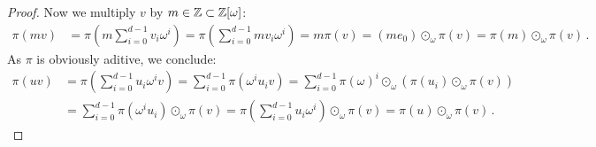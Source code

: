 \begin{proof}
Now we multiply $v$ by $m\in\mathbb{Z}\subset\mathbb{Z}[\omega]$:
\begin{align*}
\pi(m v)&=\pi\left(m \sum_{i=0}^{d-1} v_i \omega^i\right)=\pi \left(\sum_{i=0}^{d-1} m v_i \omega^i\right)=m \pi(v)= (m e_0) \odot_\omega\pi(v)= \pi(m)\odot_\omega\pi(v)\,.
\end{align*}
As  $\pi$ is obviously aditive, we conclude:
\begin{align*}
\pi(uv)&=\pi\left(\sum_{i=0}^{d-1} u_i \omega^i v\right)=\sum_{i=0}^{d-1}\pi(\omega^i u_i  v)=\sum_{i=0}^{d-1}\pi(\omega)^i \odot_\omega\left(\pi(u_i)\odot_\omega\pi(v)\right) \\
    &=\sum_{i=0}^{d-1}\pi(\omega^i u_i)\odot_\omega \pi(v)=\pi\left(\sum_{i=0}^{d-1}u_i\omega^i\right)\odot_\omega\pi(v)=\pi(u)\odot_\omega \pi(v)\,.
\end{align*}
\end{proof}

